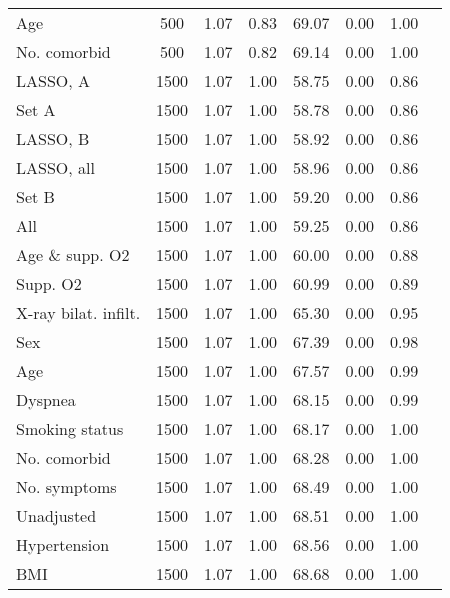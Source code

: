\documentclass{article}
\begin{document}
{\begin{longtable}{lccccccc}
Age & 500 & 1.07 & 0.83 & 69.07 & 0.00 & 1.00\\
No. comorbid & 500 & 1.07 & 0.82 & 69.14 & 0.00 & 1.00\\ \midrule
LASSO, A & 1500 & 1.07 & 1.00 & 58.75 & 0.00 & 0.86\\
Set A & 1500 & 1.07 & 1.00 & 58.78 & 0.00 & 0.86\\
LASSO, B & 1500 & 1.07 & 1.00 & 58.92 & 0.00 & 0.86\\
LASSO, all & 1500 & 1.07 & 1.00 & 58.96 & 0.00 & 0.86\\
Set B & 1500 & 1.07 & 1.00 & 59.20 & 0.00 & 0.86\\
All & 1500 & 1.07 & 1.00 & 59.25 & 0.00 & 0.86\\
Age \& supp. O2 & 1500 & 1.07 & 1.00 & 60.00 & 0.00 & 0.88\\
Supp. O2 & 1500 & 1.07 & 1.00 & 60.99 & 0.00 & 0.89\\
X-ray bilat. infilt. & 1500 & 1.07 & 1.00 & 65.30 & 0.00 & 0.95\\
Sex & 1500 & 1.07 & 1.00 & 67.39 & 0.00 & 0.98\\
Age & 1500 & 1.07 & 1.00 & 67.57 & 0.00 & 0.99\\
Dyspnea & 1500 & 1.07 & 1.00 & 68.15 & 0.00 & 0.99\\
Smoking status & 1500 & 1.07 & 1.00 & 68.17 & 0.00 & 1.00\\
No. comorbid & 1500 & 1.07 & 1.00 & 68.28 & 0.00 & 1.00\\
No. symptoms & 1500 & 1.07 & 1.00 & 68.49 & 0.00 & 1.00\\
Unadjusted & 1500 & 1.07 & 1.00 & 68.51 & 0.00 & 1.00\\
Hypertension & 1500 & 1.07 & 1.00 & 68.56 & 0.00 & 1.00\\
BMI & 1500 & 1.07 & 1.00 & 68.68 & 0.00 & 1.00\\
\bottomrule
\hline
\end{longtable}
}

\clearpage
\end{document}
